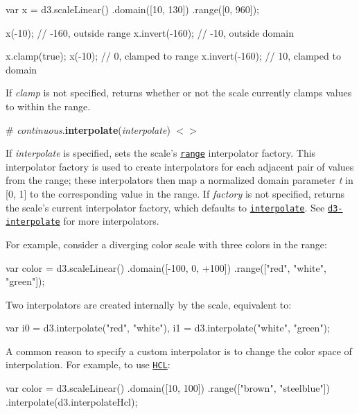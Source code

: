 \begin{DoxyCode}
var x = d3.scaleLinear()
    .domain([10, 130])
    .range([0, 960]);

x(-10); // -160, outside range
x.invert(-160); // -10, outside domain

x.clamp(true);
x(-10); // 0, clamped to range
x.invert(-160); // 10, clamped to domain
\end{DoxyCode}


If {\itshape clamp} is not specified, returns whether or not the scale currently clamps values to within the range.

\label{_continuous_interpolate}%
\# {\itshape continuous}.{\bfseries interpolate}({\itshape interpolate}) \href{https://github.com/d3/d3-scale/blob/master/src/continuous.js#L108}{\tt $<$$>$}

If {\itshape interpolate} is specified, sets the scale’s \href{#continuous_range}{\tt range} interpolator factory. This interpolator factory is used to create interpolators for each adjacent pair of values from the range; these interpolators then map a normalized domain parameter {\itshape t} in \mbox{[}0, 1\mbox{]} to the corresponding value in the range. If {\itshape factory} is not specified, returns the scale’s current interpolator factory, which defaults to \href{https://github.com/d3/d3-interpolate#interpolate}{\tt interpolate}. See \href{https://github.com/d3/d3-interpolate}{\tt d3-\/interpolate} for more interpolators.

For example, consider a diverging color scale with three colors in the range\+:


\begin{DoxyCode}
var color = d3.scaleLinear()
    .domain([-100, 0, +100])
    .range(["red", "white", "green"]);
\end{DoxyCode}


Two interpolators are created internally by the scale, equivalent to\+:


\begin{DoxyCode}
var i0 = d3.interpolate("red", "white"),
    i1 = d3.interpolate("white", "green");
\end{DoxyCode}


A common reason to specify a custom interpolator is to change the color space of interpolation. For example, to use \href{https://github.com/d3/d3-interpolate#interpolateHcl}{\tt H\+CL}\+:


\begin{DoxyCode}
var color = d3.scaleLinear()
    .domain([10, 100])
    .range(["brown", "steelblue"])
    .interpolate(d3.interpolateHcl);
\end{DoxyCode}



